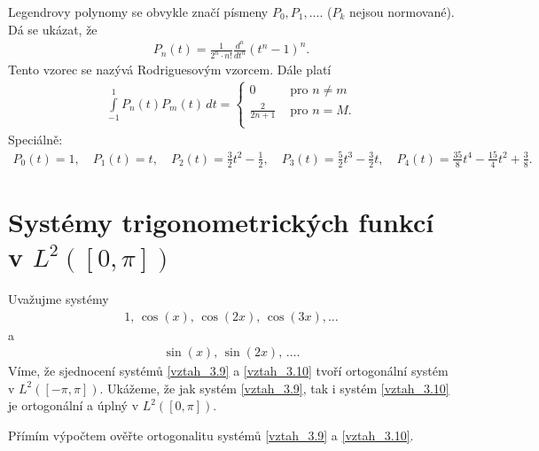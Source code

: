 \begin{poznamka}

Legendrovy polynomy se obvykle značí písmeny $P_0, P_1, \ldots$. ($P_k$ nejsou normované). Dá se ukázat, že
\begin{align*}
P_n(t) = \frac{1}{2^n \cdot n!} \frac{d^n}{dt^n} (t^n - 1)^n.
\end{align*}
Tento vzorec se nazývá Rodriguesovým vzorcem. Dále platí
\begin{align*}
\int \limits_{-1}^1 P_n(t) P_m(t) \, dt = 
\left\{
\begin{array}{cl}
0 & \textrm{ pro } n\neq m\\
\frac{2}{2n + 1} & \textrm{ pro } n=M.\\
\end{array}
\right.
\end{align*}
Speciálně:
\begin{align*}
P_0(t) = 1, \quad P_1(t) = t, \quad P_2 (t) = \frac{3}{2} t^2 - \frac{1}{2}, \quad P_3(t) = \frac{5}{2} t^3 - \frac{3}{2} t, \quad P_4(t) = \frac{35}{8} t^4 - \frac{15}{4} t^2 + \frac{3}{8}.
\end{align*}

\end{poznamka}




\section{Systémy trigonometrických funkcí v \texorpdfstring{$L^2([ 0, \pi ])$}{L2}}

\begin{priklad}

Uvažujme systémy
\begin{align}\label{vztah_3.9}
1,\, \cos (x),\, \cos(2x),\, \cos(3x), \ldots
\end{align}
a
\begin{align}\label{vztah_3.10}
\sin(x),\, \sin(2x),\, \ldots.
\end{align}
Víme, že sjednocení systémů \eqref{vztah_3.9} a \eqref{vztah_3.10} tvoří ortogonální systém v $L^2([ -\pi, \pi])$. Ukážeme, že jak systém \eqref{vztah_3.9}, tak i systém \eqref{vztah_3.10} je ortogonální a úplný v $L^2([ 0, \pi])$. 

\end{priklad}

\begin{uloha}
Přímím výpočtem ověřte ortogonalitu systém\r u \eqref{vztah_3.9} a \eqref{vztah_3.10}.
\end{uloha}


